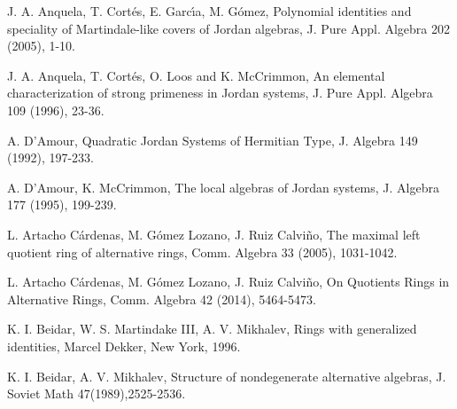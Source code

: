 \documentclass[a4paper,twoside,11pt]{article}
\theoremstyle{plain}
\theoremstyle{miestilo}
\theoremstyle{misnotas}
\begin{document}
\begin{thebibliography}{11111111}








 J. A. Anquela, T. Cort\'{e}s, E. Garc\'{\i}a, M. G\'{o}mez, Polynomial identities and speciality of Martindale-like covers of Jordan algebras, J. Pure Appl. Algebra  202
(2005), 1-10.

  J. A. Anquela, T. Cort\'{e}s, O. Loos and K. McCrimmon,  An elemental characterization of strong primeness in Jordan systems, J. Pure Appl. Algebra  109
(1996), 23-36.


    A. D'Amour, Quadratic Jordan Systems of
Hermitian Type,  J. Algebra 149
 (1992), 197-233.

  A. D'Amour, K. McCrimmon,  The local algebras of Jordan systems,
  J. Algebra  177
(1995), 199-239.

 L. Artacho C\'{a}rdenas, M. G\'{o}mez Lozano, J. Ruiz Calvi\~{n}o,  The maximal left quotient ring of alternative rings, Comm. Algebra  33 (2005), 1031-1042.

 L. Artacho C\'{a}rdenas, M. G\'{o}mez Lozano, J. Ruiz Calvi\~{n}o,  On Quotients Rings in Alternative Rings, Comm. Algebra  42 (2014), 5464-5473.


 K. I. Beidar, W. S. Martindake III, A. V. Mikhalev, Rings with generalized identities, Marcel Dekker, New York, 1996.

 K. I. Beidar, A. V. Mikhalev, Structure of nondegenerate alternative algebras, J. Soviet Math 47(1989),2525-2536.





\end{thebibliography}
\end{document}
